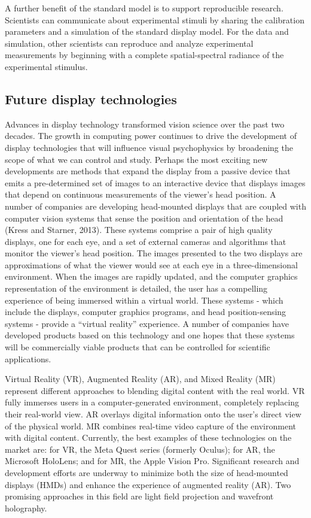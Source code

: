 \documentclass[
  letterpaper,
]{book}
\begin{document}
A further benefit of the standard model is to support reproducible
research. Scientists can communicate about experimental stimuli by
sharing the calibration parameters and a simulation of the standard
display model. For the data and simulation, other scientists can
reproduce and analyze experimental measurements by beginning with a
complete spatial-spectral radiance of the experimental stimulus.

\subsection{Future display
technologies}\label{future-display-technologies}

Advances in display technology transformed vision science over the past
two decades. The growth in computing power continues to drive the
development of display technologies that will influence visual
psychophysics by broadening the scope of what we can control and study.
Perhaps the most exciting new developments are methods that expand the
display from a passive device that emits a pre-determined set of images
to an interactive device that displays images that depend on continuous
measurements of the viewer's head position. A number of companies are
developing head-mounted displays that are coupled with computer vision
systems that sense the position and orientation of the head (Kress and
Starner, 2013). These systems comprise a pair of high quality displays,
one for each eye, and a set of external cameras and algorithms that
monitor the viewer's head position. The images presented to the two
displays are approximations of what the viewer would see at each eye in
a three-dimensional environment. When the images are rapidly updated,
and the computer graphics representation of the environment is detailed,
the user has a compelling experience of being immersed within a virtual
world. These systems - which include the displays, computer graphics
programs, and head position-sensing systems - provide a ``virtual
reality'' experience. A number of companies have developed products
based on this technology and one hopes that these systems will be
commercially viable products that can be controlled for scientific
applications.

Virtual Reality (VR), Augmented Reality (AR), and Mixed Reality (MR)
represent different approaches to blending digital content with the real
world. VR fully immerses users in a computer-generated environment,
completely replacing their real-world view. AR overlays digital
information onto the user's direct view of the physical world. MR
combines real-time video capture of the environment with digital
content. Currently, the best examples of these technologies on the
market are: for VR, the Meta Quest series (formerly Oculus); for AR, the
Microsoft HoloLens; and for MR, the Apple Vision Pro. Significant
research and development efforts are underway to minimize both the size
of head-mounted displays (HMDs) and enhance the experience of augmented
reality (AR). Two promising approaches in this field are light field
projection and wavefront holography.
\end{document}
